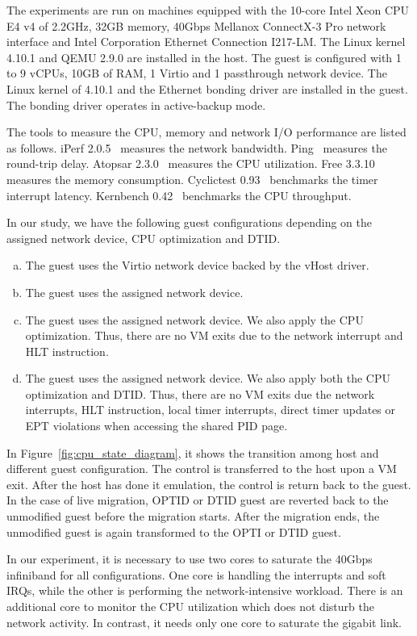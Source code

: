 
The experiments are run on machines equipped with the 10-core
Intel Xeon CPU E4 v4 of 2.2GHz, 32GB memory, 40Gbps Mellanox
ConnectX-3 Pro network interface and Intel Corporation
Ethernet Connection I217-LM. The Linux kernel 4.10.1 and QEMU
2.9.0 are installed in the host. The guest is configured with
1 to 9 vCPUs, 10GB of RAM, 1 Virtio and 1 passthrough network
device. The Linux kernel of 4.10.1 and the Ethernet bonding
driver are installed in the guest. The bonding driver operates
in active-backup mode.

The tools to measure the CPU, memory and network I/O
performance are listed as follows. iPerf 2.0.5~\cite{iperf}
measures the network bandwidth. Ping~\cite{ping} measures the
round-trip delay. Atopsar 2.3.0~\cite{atopsar} measures the
CPU utilization. Free 3.3.10~\cite{free} measures the memory
consumption. Cyclictest 0.93~\cite{cyclictest} benchmarks the
timer interrupt latency. Kernbench 0.42~\cite{kernbench}
benchmarks the CPU throughput.

In our study, we have the following guest configurations
depending on the assigned network device, CPU optimization and
DTID.
\begin{enumerate}[(a)]
  \item The guest uses the Virtio network device backed by the
  vHost driver.
  \item The guest uses the assigned network device.
  \item The guest uses the assigned network device. We also
  apply the CPU optimization. Thus, there are no VM exits due
  to the network interrupt and HLT instruction.
  \item The guest uses the assigned network device. We also
  apply both the CPU optimization and DTID. Thus, there are no
  VM exits due the network interrupts, HLT instruction, local
  timer interrupts, direct timer updates or EPT violations
  when accessing the shared PID page.
  \end{enumerate}
In Figure~\ref{fig:cpu_state_diagram}, it shows the transition
among host and different guest configuration. The control is
transferred to the host upon a VM exit. After the host has
done it emulation, the control is return back to the guest. In
the case of live migration, OPTID or DTID guest are reverted
back to the unmodified guest before the migration starts.
After the migration ends, the unmodified guest is again
transformed to the OPTI or DTID guest.

In our experiment, it is necessary to use two cores to
saturate the 40Gbps infiniband for all configurations. One
core is handling the interrupts and soft IRQs, while the other
is performing the network-intensive workload. There is an
additional core to monitor the CPU utilization which does not
disturb the network activity. In contrast, it needs only one
core to saturate the gigabit link.
